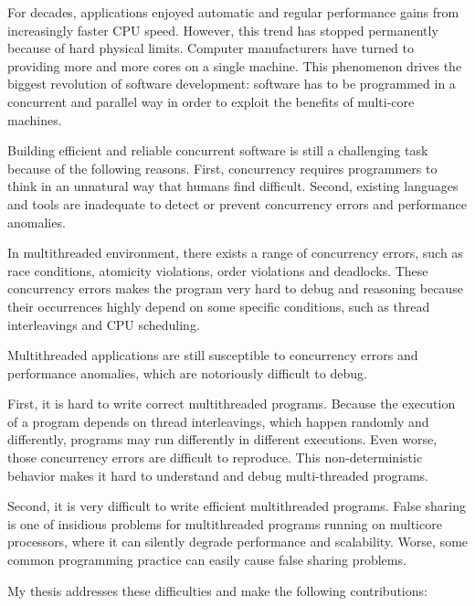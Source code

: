 For decades, applications enjoyed automatic and regular performance gains from increasingly faster CPU speed.  However, this trend has stopped permanently because of hard physical limits. Computer manufacturers have turned to providing more and more cores on a single machine. This phenomenon drives the biggest revolution of software development: software has to be programmed in a concurrent and parallel way in order to exploit the benefits of multi-core machines.

Building efficient and reliable concurrent software is still a challenging task because of the following reasons. First, concurrency requires programmers to think in an unnatural way that humans find difficult.  Second, existing languages and tools are inadequate to detect or prevent concurrency errors and performance anomalies. 

In multithreaded environment, there exists a range of concurrency errors, such as race conditions, atomicity violations, order violations and deadlocks. These concurrency errors makes the program very hard to debug and reasoning because their occurrences highly depend on some specific conditions, such as thread interleavings and CPU scheduling. 

Multithreaded applications are still susceptible to concurrency errors and performance anomalies, which are notoriously difficult to debug. 

First, it is hard to write correct multithreaded programs.  
Because the execution of a program depends on thread interleavings, which happen randomly and differently, programs may run differently in different executions. Even worse, those concurrency errors are difficult to reproduce. This non-deterministic behavior makes it hard to understand and debug multi-threaded programs.

Second, it is very difficult to write efficient multithreaded programs. False sharing is one of insidious problems for multithreaded programs running on multicore processors, where it can silently degrade performance and scalability. Worse, some common programming practice can easily cause false sharing problems.


My thesis addresses these difficulties and make the following contributions:

